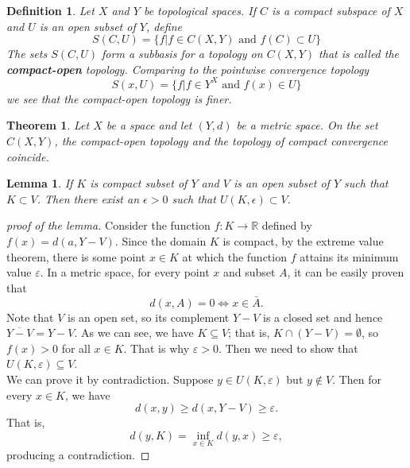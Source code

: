 \documentclass[article,11pt, reqno]{article}
\newtheorem*{theorem}{Theorem}
\newtheorem*{lemma}{Lemma}
\newtheorem*{definition}{Definition}
\theoremstyle{remark}
\newcommand{\<}{\langle}
\renewcommand{\>}{\rangle}
\begin{document}
\begin{definition}
    Let $X$ and $Y$ be topological spaces. If $C$ is a compact subspace of $X$ and $U$ is an open subset of $Y$, define
    $$
        S(C,U)=\{f | f \in C(X,Y)\text{ and } f(C)\subset U\}
    $$
    The sets $S(C,U)$ form a subbasis for a topology on $C(X,Y)$ that is called the \textbf{compact-open} topology. Comparing to the pointwise convergence topology
    $$
        S(x,U)=\{f | f \in Y^X\text{ and }f(x)\in U\}
    $$
    we see that the compact-open topology is finer.
\end{definition}
\begin{theorem}
    Let $X$ be a space and let $(Y, d)$ be a metric space. On the set $C(X, Y )$, the compact-open topology and the topology of compact convergence coincide.
\end{theorem}
\begin{lemma}
    If $K$ is compact subset of $Y$ and $V$ is an open subset of $Y$ such that $K\subset V$. Then there exist an $\epsilon>0$ such that $U(K,\epsilon) \subset V$.
\end{lemma}
\begin{proof}[proof of the lemma]
    Consider the function $f:K\to\mathbb{R}$ defined by $f(x)=d(a,Y-V)$. Since the domain $K$ is compact, by the extreme value theorem, there is some point $x\in K$ at which the function $f$ attains its minimum value $\varepsilon$. 
    In a metric space, for every point $x$ and subset $A$, it can be easily proven that 
    $$
        d(x,A)=0\iff x\in\bar{A}.
    $$
    Note that $V$ is an open set, so its complement $Y-V$ is a closed set and hence $\overline{Y-V}=Y-V$. As we can see, we have $K\subseteq V$; that is, $K\cap(Y-V)=\emptyset$, so $f(x)>0$ for all $x\in K$. That is why $\varepsilon>0$. Then we need to show that $U(K,\varepsilon)\subseteq V$.\\
    We can prove it by contradiction. Suppose $y\in U(K,\varepsilon)$ but $y\notin V$. Then for every $x\in K$, we have 
    $$
        d(x,y)\geq d(x,Y-V)\geq\varepsilon.
    $$
    That is, 
    $$
        d(y,K)=\inf_{x\in K}{d(y,x)}\geq\varepsilon,
    $$
    producing a contradiction. 
\end{proof}
\end{document}
